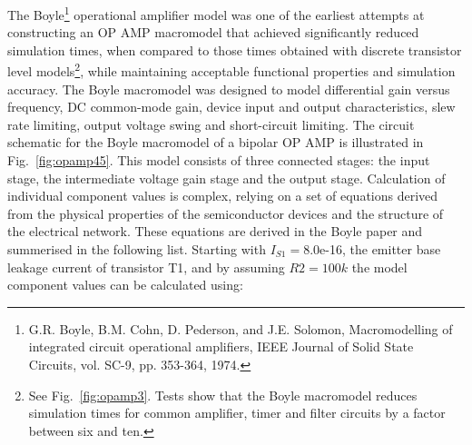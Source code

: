 The Boyle\footnote{G.R. Boyle, B.M. Cohn, D. Pederson, and J.E. Solomon, Macromodelling of integrated circuit operational amplifiers, IEEE Journal of Solid State Circuits, vol. SC-9, pp. 353-364, 1974.} operational amplifier model was one of the earliest attempts at constructing an OP AMP macromodel that achieved significantly reduced simulation times, when compared to those times obtained with discrete transistor level models\footnote{See Fig.~\ref{fig:opamp3}. Tests show that the Boyle macromodel reduces simulation times for common amplifier, timer and filter circuits by a factor between six and ten.}, while maintaining acceptable functional properties and simulation accuracy. The Boyle macromodel was designed to model differential gain versus frequency, DC common-mode gain, device input and output characteristics, slew rate limiting, output voltage swing and short-circuit limiting.  The circuit schematic for the Boyle macromodel of a bipolar OP AMP  is illustrated in Fig.~\ref{fig:opamp45}. This model consists of three connected stages: the input stage, the intermediate voltage gain stage and the output stage. Calculation of individual component values is complex, relying on a set of equations derived from the physical properties of the semiconductor devices and the structure of the electrical network.  These equations are derived in the Boyle paper and summerised in the following list. Starting with $I_{S1} = $8.0e-16, the emitter base leakage current of transistor T1, and by assuming $R2 = 100k$ the model component values can be calculated using:
